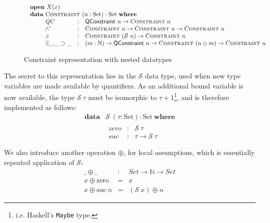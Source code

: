 \documentclass[a4paper]{jfp}
\begin{document}
\begin{figure}[H]
\begin{displaymath}
\begin{array}{l}
	\begin{array}{l}
      \textbf{open}\  X(x)\\ 
		\textbf{data}\  \textsc{Constraint}\ (n :\text{Set}) : \text{Set}\ \textbf{where} \\ \qquad
		               \begin{array}{lcl}
                   \mathit{QC} & : &   \textsf{QConstraint}\ n \rightarrow \textsc{Constraint}\ n \\
						 \land'   & : & \textsc{Constraint}\ n \rightarrow \textsc{Constraint}\ n 
                                                              \rightarrow \textsc{Constraint}\ n \\
						 \Finv    & : & \textsc{Constraint}\ (\mathcal{S}\ n) \rightarrow \textsc{Constraint}\ n \\
                   \exists\_.\_\supset\_ & : & (m : \mathbb{N}) \rightarrow \textsf{QConstraint}\ n \rightarrow \textsc{Constraint}\ (n \oplus m)
          \rightarrow \textsc{Constraint}\ n
					    \end{array} \\
     \end{array}
   \end{array}
\end{displaymath}
\caption{Constraint representation with nested datatypes}
\end{figure}

The secret to this representation lies in the $\mathcal{S}$ data type, used when new type variables are made available by quantifiers. As an
additional bound variable is now available, the type $\mathcal{S}\ \tau$ must be isomorphic to $\tau + 1$\footnote{i.e. Haskell's {\tt Maybe} type.},
and is therefore implemented as follows:
\begin{displaymath}   
	\begin{array}{ll}		
		\textbf{data} & \mathcal{S}\ (\tau : \text{Set}) : \text{Set}\ \textbf{where} \\
		              & \begin{array}{lcl}
                         \mathit{zero} & : & \mathcal{S}\ \tau \\
						 \mathit{suc} & : & \tau \rightarrow \mathcal{S}\ \tau \\
					    \end{array} \\						
     \end{array}
\end{displaymath}	 
We also introduce another operation $\oplus$, for local assumptions, which is essentially repeated application of $\mathcal{S}$:
\begin{displaymath}
   \begin{array}{lll}
      \_ \oplus \_ & : & Set \rightarrow \mathbb{N} \rightarrow Set \\
      x \oplus \text{zero} & = & x \\ 
      x \oplus \text{suc}\ n & = & (\mathcal{S}\ x) \oplus n
      \end{array}
\end{displaymath}
\end{document}
